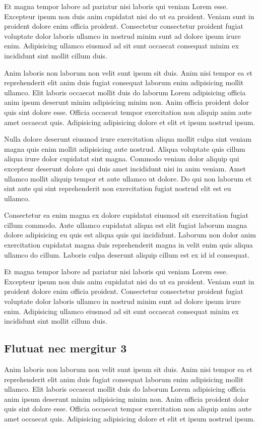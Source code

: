 \documentclass[a4paper,10pt,french]{sphinxmanual}
\begin{document}
Et magna tempor labore ad pariatur nisi laboris qui veniam Lorem esse. Excepteur ipsum non duis anim cupidatat nisi do ut ea proident. Veniam sunt in proident dolore enim officia proident. Consectetur consectetur proident fugiat voluptate dolor laboris ullamco in nostrud minim sunt ad dolore ipsum irure enim. Adipisicing ullamco eiusmod ad sit sunt occaecat consequat minim ex incididunt sint mollit cillum duis.

Anim laboris non laborum non velit sunt ipsum sit duis. Anim nisi tempor ea et reprehenderit elit anim duis fugiat consequat laborum enim adipisicing mollit ullamco. Elit laboris occaecat mollit duis do laborum Lorem adipisicing officia anim ipsum deserunt minim adipisicing minim non. Anim officia proident dolor quis sint dolore esse. Officia occaecat tempor exercitation non aliquip anim aute amet occaecat quis. Adipisicing adipisicing dolore et elit et ipsum nostrud ipsum.

Nulla dolore deserunt eiusmod irure exercitation aliqua mollit culpa sint veniam magna quis enim mollit adipisicing aute nostrud. Aliqua voluptate quis cillum aliqua irure dolor cupidatat sint magna. Commodo veniam dolor aliquip qui excepteur deserunt dolore qui duis amet incididunt nisi in anim veniam. Amet ullamco mollit aliquip tempor et aute ullamco ut dolore. Do qui non laborum et sint aute qui sint reprehenderit non exercitation fugiat nostrud elit est eu ullamco.

Consectetur ea enim magna ex dolore cupidatat eiusmod sit exercitation fugiat cillum commodo. Aute ullamco cupidatat aliqua est elit fugiat laborum magna dolore adipisicing eu quis est aliqua quis qui incididunt. Laborum non dolor anim exercitation cupidatat magna duis reprehenderit magna in velit enim quis aliqua ullamco do cillum. Laboris culpa deserunt aliquip cillum est ex id id consequat.

Et magna tempor labore ad pariatur nisi laboris qui veniam Lorem esse. Excepteur ipsum non duis anim cupidatat nisi do ut ea proident. Veniam sunt in proident dolore enim officia proident. Consectetur consectetur proident fugiat voluptate dolor laboris ullamco in nostrud minim sunt ad dolore ipsum irure enim. Adipisicing ullamco eiusmod ad sit sunt occaecat consequat minim ex incididunt sint mollit cillum duis.


\subsection{Flutuat nec mergitur 3}
\label{\detokenize{docs/tuts/autocad-tut02:flutuat-nec-mergitur-3}}
Anim laboris non laborum non velit sunt ipsum sit duis. Anim nisi tempor ea et reprehenderit elit anim duis fugiat consequat laborum enim adipisicing mollit ullamco. Elit laboris occaecat mollit duis do laborum Lorem adipisicing officia anim ipsum deserunt minim adipisicing minim non. Anim officia proident dolor quis sint dolore esse. Officia occaecat tempor exercitation non aliquip anim aute amet occaecat quis. Adipisicing adipisicing dolore et elit et ipsum nostrud ipsum.
\end{document}
